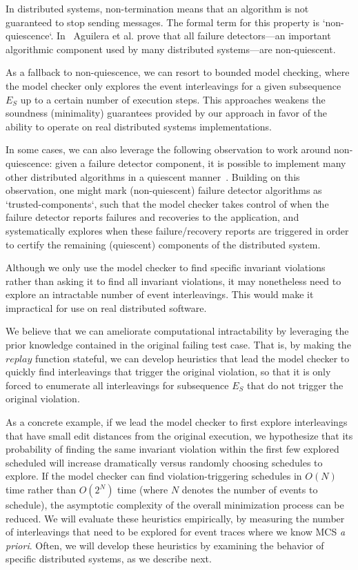 In distributed systems, non-termination means that an algorithm is not guaranteed to stop
sending messages. The formal term for this property is `non-quiescence`. In~\cite{aguilera1997heartbeat} Aguilera et al. prove that
all failure detectors---an important algorithmic component used by many distributed systems---are
non-quiescent.

As a fallback to non-quiescence, we can resort to
bounded model checking, where the model checker only explores the event
interleavings for a given subsequence $E_S$ up to a certain number of
execution steps. This approaches weakens the soundness (minimality) guarantees provided by
our approach in favor of the ability to operate on real distributed
systems implementations.

In some cases, we can also leverage the following observation to work around
non-quiescence:
given a failure detector component, it is possible to implement many other
distributed algorithms in a quiescent manner~\cite{aguilera1997heartbeat}. Building on this observation,
one might mark (non-quiescent) failure detector algorithms as `trusted-components`,
such that the model checker takes control of when the failure detector reports
failures and recoveries to the application, and systematically explores when
these failure/recovery reports are triggered in order to certify the remaining
(quiescent) components of the distributed system.

 Although we only use the
model checker to find specific invariant violations rather than asking it to
find all invariant violations, it may nonetheless need to explore an
intractable number of event interleavings. This would make it impractical for
use on real distributed software.

We believe that we can ameliorate computational intractability by
leveraging the prior knowledge contained in the original failing test case.
That is, by making the $replay$ function stateful, we can develop heuristics that lead the
model checker to quickly find interleavings that trigger the original violation, so that
it is only forced to enumerate all interleavings for subsequence $E_S$ that do
not trigger the original violation.

As a concrete example, if we lead
the model checker to first explore interleavings that have small edit
distances from the original execution, we hypothesize that its probability of
finding the same invariant violation within the first few explored scheduled
will increase dramatically versus randomly choosing schedules to explore.
If the model checker can find violation-triggering schedules in $O(N)$ time rather than $O(2^N)$ time
(where $N$ denotes the number of events to schedule),
the asymptotic complexity of the overall minimization process can be reduced.
We will evaluate these heuristics empirically, by measuring the number of
interleavings that need to be explored for event traces where we know
MCS {\em a priori}. Often, we will develop these heuristics by examining the
behavior of specific distributed systems, as we describe next.

